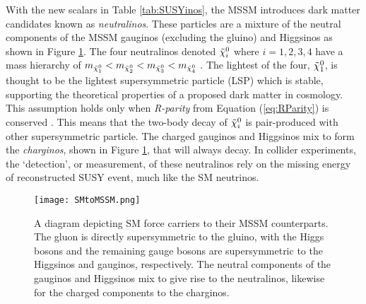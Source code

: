 With the new scalars in Table \ref{tab:SUSYinos}, the MSSM introduces dark matter candidates known as \textit{neutralinos}. These particles are a mixture of the neutral components of the MSSM gauginos (excluding the gluino) and Higgsinos as shown in Figure \ref{fig:SUSY}. The four neutralinos denoted $\Tilde{\chi}_i^0$ where $i=1,2,3,4$ have a mass hierarchy of $ m_{\Tilde{\chi}_1^0} < m_{\Tilde{\chi}_2^0} < m_{\Tilde{\chi}_3^0} < m_{\Tilde{\chi}_4^0}$ \cite{martin1997supersymmetry}. The lightest of the four, $\Tilde{\chi}_1^0$, is thought to be the lightest supersymmetric particle (LSP) which is stable, supporting the theoretical properties of a proposed dark matter in cosmology. This assumption holds only when \textit{R-parity} from Equation (\ref{eq:RParity}) is conserved \cite{martin1997supersymmetry}. This means that the two-body decay of $\Tilde{\chi}_i^0$ is pair-produced with other supersymmetric particle. The charged gauginos and Higgsinos mix to form the \textit{charginos}, shown in Figure \ref{fig:SUSY}, that will always decay. In collider experiments, the `detection', or measurement, of these neutralinos rely on the missing energy of reconstructed SUSY event, much like the SM neutrinos. \\

\begin{figure}[htbp]
    \centering
    \texttt{[image: SMtoMSSM.png]}
    \caption{A diagram depicting SM force carriers to their MSSM counterparts. The gluon is directly supersymmetric to the gluino, with the Higgs bosons and the remaining gauge bosons are supersymmetric to the Higgsinos and gauginos, respectively. The neutral components of the gauginos and Higgsinos mix to give rise to the neutralinos, likewise for the charged components to the charginos.}
    \label{fig:SUSY}
\end{figure}


